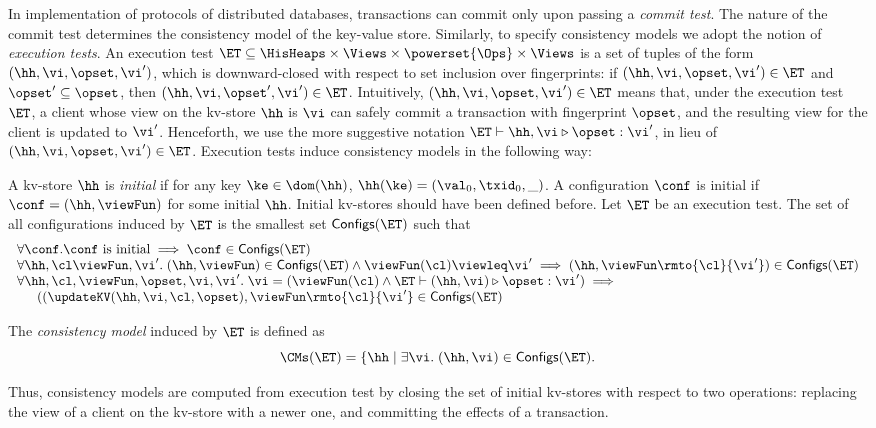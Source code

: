 In implementation of protocols of distributed databases, transactions can 
commit only upon passing a \emph{commit test}. 
The nature of the commit test determines the consistency model of 
the key-value store.
Similarly, to specify consistency models we adopt the notion of 
\emph{execution tests}. An execution test 
$\ET \subseteq \HisHeaps \times \Views \times \powerset{\Ops} \times \Views$ 
is a set of tuples of the form $(\hh, \vi, \opset, \vi')$, 
which is downward-closed with respect to set inclusion over fingerprints: 
if $(\hh, \vi, \opset, \vi') \in \ET$ and $\opset' \subseteq \opset$, then 
$(\hh, \vi, \opset', \vi') \in \ET$.
Intuitively, 
$(\hh, \vi, \opset, \vi') \in \ET$ means that, under the execution test 
$\ET$, a client whose view on the kv-store $\hh$ is $\vi$ can safely 
commit a transaction with fingerprint $\opset$, and the resulting 
view for the client is updated to $\vi'$. Henceforth, we use the more 
suggestive notation $\ET \vdash \hh, \vi \triangleright \opset : \vi'$, 
in lieu of $(\hh, \vi, \opset, \vi') \in \ET$.
Execution tests induce consistency models in the following way: 
\begin{definition}
\label{def:cm}
A kv-store $\hh$ is \emph{initial} if for any key $\ke \in \dom(\hh)$, 
$\hh(\ke) = (\val_0, \txid_0, \_)$. A configuration $\conf$ is 
initial  if $\conf = (\hh, \viewFun)$ for some initial $\hh$.
\ac{Initial kv-stores should have been defined before.}
Let $\ET$ be an execution test. The set of all configurations 
induced by $\ET$ is the smallest set $\mathsf{Configs}(\ET)$ 
such that 
\[
\begin{array}{l}
\forall \conf. \conf \text{ is initial} \implies \conf \in \mathsf{Configs}(\ET)\\
\forall \hh, \cl \viewFun,\vi'.\; (\hh, \viewFun) \in \mathsf{Configs}(\ET) \wedge \viewFun(\cl) \viewleq \vi' \implies (\hh, \viewFun\rmto{\cl}{\vi'}) \in \mathsf{Configs}(\ET)\\
\forall \hh, \cl, \viewFun, \opset, \vi, \vi'.\; \vi = (\viewFun(\cl) \wedge \ET \vdash (\hh, \vi) \triangleright \opset : \vi') \implies {}\\
\hspace{15pt}
((\updateKV(\hh, \vi, \cl, \opset), \viewFun\rmto{\cl}{\vi'} \in \mathsf{Configs}(\ET)
\end{array}
\]

The \emph{consistency model} induced by $\ET$ is defined as 
\[
\CMs(\ET) = \{ \hh \mid \exists \vi.\; (\hh, \vi) \in \mathsf{Configs}(\ET). 
\]
\end{definition}

Thus, consistency models are computed from execution test by closing the set of initial kv-stores with 
respect to two operations: replacing the view of a client on the kv-store with a newer one, and committing 
the effects of a transaction.